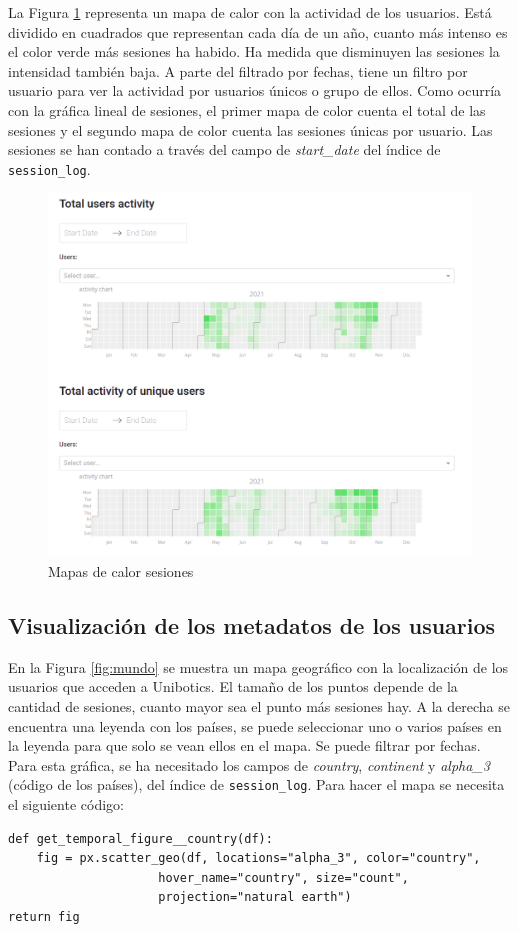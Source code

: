 La Figura \ref{fig:activity} representa un mapa de calor con la actividad de los usuarios. Está dividido en cuadrados que representan cada día de un año, cuanto más intenso es el color verde más sesiones ha habido. Ha medida que disminuyen las sesiones la intensidad también baja. A parte del filtrado por fechas, tiene un filtro por usuario para ver la actividad por usuarios únicos o grupo de ellos. Como ocurría con la gráfica lineal de sesiones, el primer mapa de color cuenta el total de las sesiones y el segundo mapa de color cuenta las sesiones únicas por usuario. Las sesiones se han contado a través del campo de \textit{start\_date} del índice de \texttt{session\_log}.


\begin{figure}[H]
    \centering
    \includegraphics[width=17cm, keepaspectratio]{img/activity.png}
    \caption{Mapas de calor sesiones}
    \label{fig:activity}
\end{figure}

\subsection{Visualización de los metadatos de los usuarios}
En la Figura \ref{fig:mundo} se muestra un mapa geográfico con la localización de los usuarios que acceden a Unibotics. El tamaño de los puntos depende de la cantidad de sesiones, cuanto mayor sea el punto más sesiones hay. A la derecha se encuentra una leyenda con los países, se puede seleccionar uno o varios países en la leyenda para que solo se vean ellos en el mapa. Se puede filtrar por fechas. Para esta gráfica, se ha necesitado los campos de \textit{country}, \textit{continent} y \textit{alpha\_3} (código de los países), del índice de \texttt{session\_log}. Para hacer el mapa se necesita el siguiente código:
\newpage
\begin{verbatim}
def get_temporal_figure__country(df):
    fig = px.scatter_geo(df, locations="alpha_3", color="country",
                     hover_name="country", size="count",
                     projection="natural earth")
return fig
\end{verbatim}


